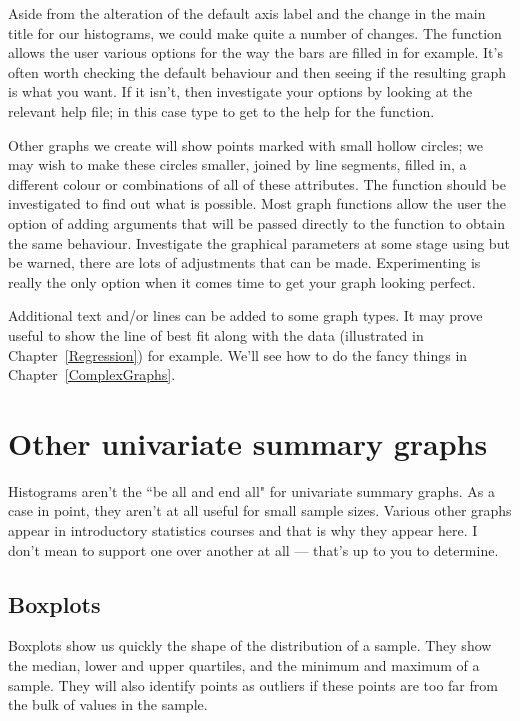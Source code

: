 Aside from the alteration of the default axis label and the change in the main title for our histograms, we could make quite a number of changes. The  function allows the user various options for the way the bars are filled in for example. It's often worth checking the default behaviour and then seeing if the resulting graph is what you want. If it isn't, then investigate your options by looking at the relevant help file; in this case type  to get to the help for the  function. 
 
 Other graphs we create will show points marked with small hollow circles; we may wish to make these circles smaller, joined by line segments, filled in, a different colour or combinations of all of these attributes. The  function should be investigated to find out what is possible. Most graph functions allow the user the option of adding arguments that will be passed directly to the  function to obtain the same behaviour. Investigate the graphical parameters at some stage using  but be warned, there are lots of adjustments that can be made. Experimenting is really the only option when it comes time to get your graph looking perfect. 
 
Additional text and/or lines can be added to some graph types. It may prove useful to show the line of best fit along with the data (illustrated in Chapter~\ref{Regression}) for example. We'll see how to do the fancy things in Chapter~\ref{ComplexGraphs}. 
 
\section{Other univariate summary graphs} 
 
Histograms aren't the ``be all and end all" for univariate summary graphs. As a case in point, they aren't at all useful for small sample sizes. Various other graphs appear in introductory statistics courses and that is why they appear here. I don't mean to support one over another at all --- that's up to you to determine. 
 
\subsection{Boxplots} 
 
Boxplots show us quickly the shape of the distribution of a sample. They show the median, lower and upper quartiles, and the minimum and maximum of a sample. They will also identify points as outliers if these points are too far from the bulk of values in the sample. 
 
